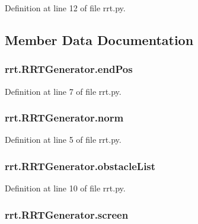 Definition at line 12 of file rrt.\-py.



\subsection{Member Data Documentation}
\hypertarget{classrrt_1_1RRTGenerator_a97423e9669ed42aa79510e45f99e9e23}{
\subsubsection[{end\-Pos}]{\setlength{\rightskip}{0pt plus 5cm}rrt.\-R\-R\-T\-Generator.\-end\-Pos}}\label{classrrt_1_1RRTGenerator_a97423e9669ed42aa79510e45f99e9e23}


Definition at line 7 of file rrt.\-py.

\hypertarget{classrrt_1_1RRTGenerator_a570c460f0b9898224869f5075f2d0a68}{
\subsubsection[{norm}]{\setlength{\rightskip}{0pt plus 5cm}rrt.\-R\-R\-T\-Generator.\-norm}}\label{classrrt_1_1RRTGenerator_a570c460f0b9898224869f5075f2d0a68}


Definition at line 5 of file rrt.\-py.

\hypertarget{classrrt_1_1RRTGenerator_aff6d3b391980c5951446c10342d417c8}{
\subsubsection[{obstacle\-List}]{\setlength{\rightskip}{0pt plus 5cm}rrt.\-R\-R\-T\-Generator.\-obstacle\-List}}\label{classrrt_1_1RRTGenerator_aff6d3b391980c5951446c10342d417c8}


Definition at line 10 of file rrt.\-py.

\hypertarget{classrrt_1_1RRTGenerator_ad0cc9ff4a66a1e9f8210270232b250a4}{
\subsubsection[{screen}]{\setlength{\rightskip}{0pt plus 5cm}rrt.\-R\-R\-T\-Generator.\-screen}}\label{classrrt_1_1RRTGenerator_ad0cc9ff4a66a1e9f8210270232b250a4}


